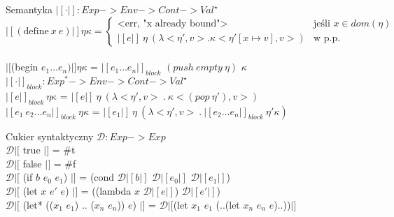 \documentclass[12pt,serif]{beamer}
\begin{document}
\begin{frame}{Semantyka}
$|[ \cdot |]: Exp -> Env -> Cont -> Val^{\star}$ \newline
\\
\footnotesize \[
 |[(\text{define}~x~e)|] \eta \kappa =
  \begin{cases}
   \text{<err, "x already bound">} & \text{jeśli } x \in dom(\eta) \\
   |[e|] ~ \eta ~ (\lambda <\eta', v> . \kappa <\eta'[x \mapsto v], v>) & \text{w p.p.}
  \end{cases}
\] \newline
\\
\normalsize $|[$(begin $e_1 \ldots e_n)|] \eta \kappa$ =
  $|[e_1 \ldots e_n|]_{block}$ $(push~empty~\eta)$ $\kappa$ \newline
\\
$|[ \cdot |]_{block}: Exp^{*} -> Env -> Cont -> Val^{\star}$ \newline
\\
$|[ e |]_{block} ~\eta \kappa$ =
  $|[ e |] ~ \eta ~ (\lambda <\eta', v> ~ . ~ \kappa <(pop~\eta'), v>)$ \\
$|[ e_1 ~ e_2 \ldots e_n |]_{block} ~\eta \kappa$ =
  $|[ e_1 |] ~ \eta ~ (\lambda <\eta', v> ~ . ~ |[ e_2 \ldots e_n |]_{block} ~ \eta' \kappa )$ \\
\end{frame}


\begin{frame}{Cukier syntaktyczny}
$\mathcal{D} : Exp -> Exp$ \newline
\\
$\mathcal{D}|[$ true $|]$ = \#t \\
$\mathcal{D}|[$ false $|]$ = \#f \newline
\\
$\mathcal{D}|[$ (if $b$ $e_0$ $e_1$) $|]$ =
   (cond $\mathcal{D}|[ b |]$ $\mathcal{D}|[ e_0 |]$ $\mathcal{D}|[ e_1 |]$) \newline
\\
$\mathcal{D}|[$ (let $x$ $e'$ $e$) $|]$ =
   ((lambda $x$ $\mathcal{D}|[e|]$) $\mathcal{D}|[e'|]$) \\
$\mathcal{D}|[$ (let* (($x_1$ $e_1$) .. ($x_n$ $e_n$)) $e$) $|]$ = 
   $\mathcal{D}|[$(let $x_1$ $e_1$ (..(let $x_n$ $e_n$ $e$)..))$|]$ \\
\end{frame}
\end{document}
